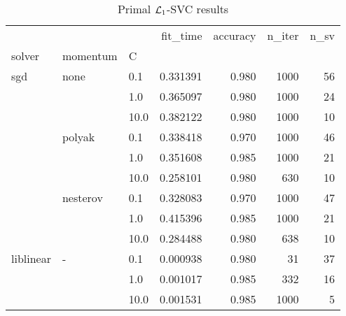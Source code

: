 \begin{table}[H]
\centering
\caption{Primal $\protect \mathcal{L}_1$-SVC results}
\label{primal_l1_svc_cv_results}
\begin{tabular}{lllrrrr}
\toprule
          &   &      &  fit\_time &  accuracy &  n\_iter &  n\_sv \\
solver & momentum & C &           &           &         &       \\
\midrule
sgd & none & 0.1  &  0.331391 &     0.980 &    1000 &    56 \\
          &   & 1.0  &  0.365097 &     0.980 &    1000 &    24 \\
          &   & 10.0 &  0.382122 &     0.980 &    1000 &    10 \\
          & polyak & 0.1  &  0.338418 &     0.970 &    1000 &    46 \\
          &   & 1.0  &  0.351608 &     0.985 &    1000 &    21 \\
          &   & 10.0 &  0.258101 &     0.980 &     630 &    10 \\
          & nesterov & 0.1  &  0.328083 &     0.970 &    1000 &    47 \\
          &   & 1.0  &  0.415396 &     0.985 &    1000 &    21 \\
          &   & 10.0 &  0.284488 &     0.980 &     638 &    10 \\
liblinear & - & 0.1  &  0.000938 &     0.980 &      31 &    37 \\
          &   & 1.0  &  0.001017 &     0.985 &     332 &    16 \\
          &   & 10.0 &  0.001531 &     0.985 &    1000 &     5 \\
\bottomrule
\end{tabular}
\end{table}
